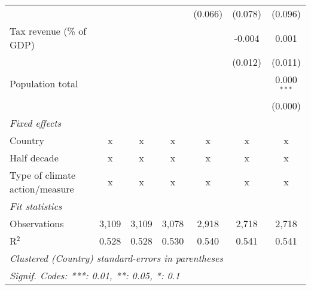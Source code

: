 \begin{tabular}{lcccccc}
                                                              &         &              &             & (0.066)     & (0.078)     & (0.096)\\   
   Tax revenue (\% of GDP)                                    &         &              &             &             & -0.004      & 0.001\\   
                                                              &         &              &             &             & (0.012)     & (0.011)\\   
   Population total                                           &         &              &             &             &             & 0.000$^{***}$\\   
                                                              &         &              &             &             &             & (0.000)\\   
   \emph{Fixed effects}\\
   Country                                                    & x       & x            & x           & x           & x           & x\\  
   Half decade                                                & x       & x            & x           & x           & x           & x\\  
   Type of climate action/measure                             & x       & x            & x           & x           & x           & x\\  
   \midrule \emph{Fit statistics}\\
   Observations                                               & 3,109   & 3,109        & 3,078       & 2,918       & 2,718       & 2,718\\  
   R$^2$                                                      & 0.528   & 0.528        & 0.530       & 0.540       & 0.541       & 0.541\\  
   \midrule
   \multicolumn{7}{l}{\emph{Clustered (Country) standard-errors in parentheses}}\\
   \multicolumn{7}{l}{\emph{Signif. Codes: ***: 0.01, **: 0.05, *: 0.1}}\\
\end{tabular}
\par\endgroup


